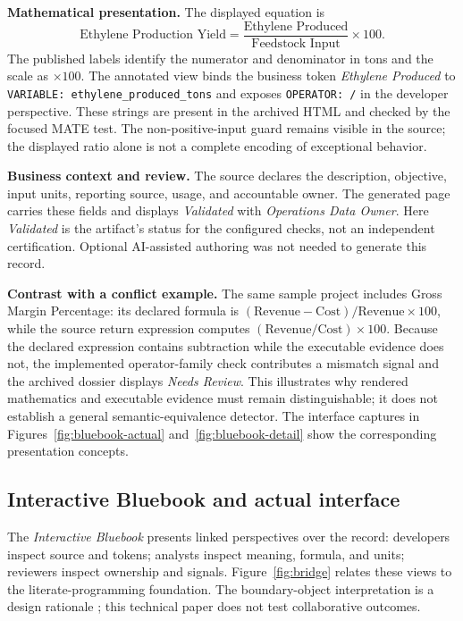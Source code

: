 \documentclass[a4paper,fleqn]{cas-dc}
\newcommand{\bluebook}{\emph{Interactive Bluebook}}
\begin{document}
\textbf{Mathematical presentation.} The displayed equation is
\begin{equation}
\text{Ethylene Production Yield}
  =\frac{\text{Ethylene Produced}}{\text{Feedstock Input}}\times100.
\end{equation}
The published labels identify the numerator and denominator in tons and the scale as $\times100$. The annotated view binds the business token \emph{Ethylene Produced} to \texttt{VARIABLE: ethylene\_produced\_tons} and exposes \texttt{OPERATOR: /} in the developer perspective. These strings are present in the archived HTML and checked by the focused MATE test. The non-positive-input guard remains visible in the source; the displayed ratio alone is not a complete encoding of exceptional behavior.

\textbf{Business context and review.} The source declares the description, objective, input units, reporting source, usage, and accountable owner. The generated page carries these fields and displays \emph{Validated} with \emph{Operations Data Owner}. Here \emph{Validated} is the artifact's status for the configured checks, not an independent certification. Optional AI-assisted authoring was not needed to generate this record.

\textbf{Contrast with a conflict example.} The same sample project includes Gross Margin Percentage: its declared formula is $(\mathrm{Revenue}-\mathrm{Cost})/\mathrm{Revenue}\times100$, while the source return expression computes $(\mathrm{Revenue}/\mathrm{Cost})\times100$. Because the declared expression contains subtraction while the executable evidence does not, the implemented operator-family check contributes a mismatch signal and the archived dossier displays \emph{Needs Review}. This illustrates why rendered mathematics and executable evidence must remain distinguishable; it does not establish a general semantic-equivalence detector. The interface captures in Figures~\ref{fig:bluebook-actual} and~\ref{fig:bluebook-detail} show the corresponding presentation concepts.

\subsection{Interactive Bluebook and actual interface}

The \bluebook{} presents linked perspectives over the record: developers inspect source and tokens; analysts inspect meaning, formula, and units; reviewers inspect ownership and signals. Figure~\ref{fig:bridge} relates these views to the literate-programming foundation. The boundary-object interpretation is a design rationale \citep{StarGriesemer1989}; this technical paper does not test collaborative outcomes.
\end{document}
